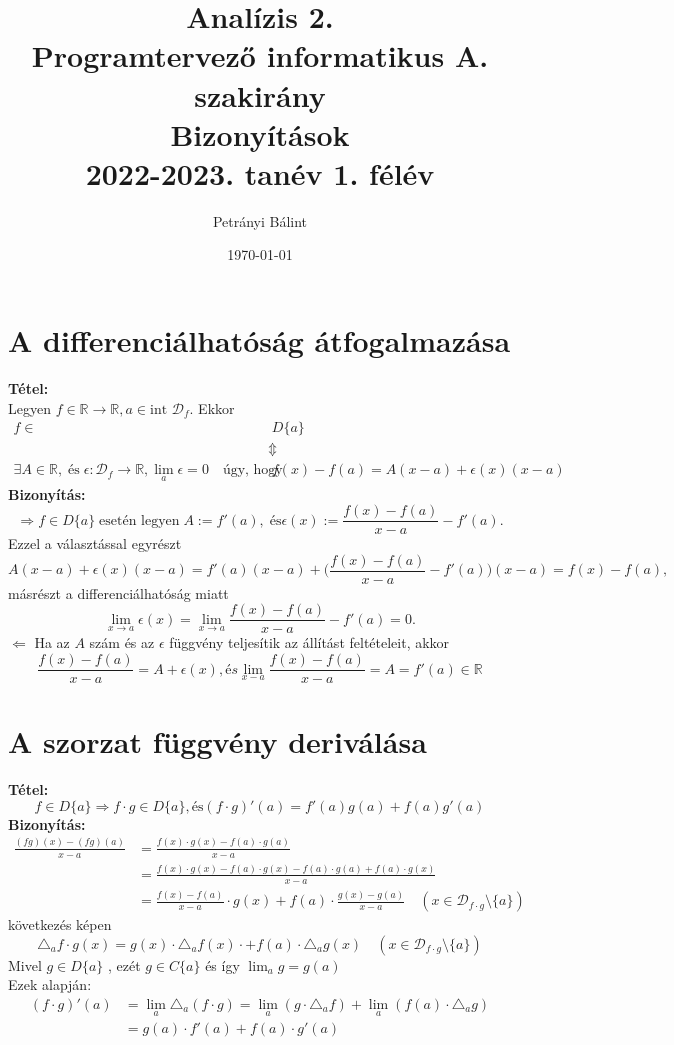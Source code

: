 \documentclass[10pt,a4paper]{article}
\date{\today}
\author{Petrányi Bálint}
\title{%
	\textbf{Analízis 2.} \\
	\textbf{Programtervező informatikus A. szakirány} \\
	\medskip
	Bizonyítások\\
	\large 2022-2023. tanév 1. félév
}
\newcommand{\D}{\mathcal{D}}
\newcommand{\f}[1][x]{f(#1)}
\newcommand{\g}[1][x]{g(#1)}
\begin{document}
\maketitle
\tableofcontents
\newpage
\section{A differenciálhatóság átfogalmazása}
\textbf{Tétel:} \\ 
Legyen $f \in \mathbb{R} \rightarrow \mathbb{R}, a \in \text{int } \mathcal{D}_f$. Ekkor
\[
\begin{split}
f \in & \; D\{a\} \\
& \Updownarrow \\
\exists A \in \mathbb{R}, \; \text{és} \; \epsilon : \mathcal{D}_f \rightarrow \mathbb{R}, \lim_a{\epsilon} = 0 \quad \text{úgy, hogy } & \; f(x)- f(a) = A(x-a)+\epsilon (x)(x-a)
\end{split}
\]
\textbf{Bizonyítás:}
\[
\Longrightarrow f \in D\{a\} \; \text{esetén legyen} \; A:=f'(a), \; \text{és} \epsilon (x) := \frac{f(x)-f(a)}{x-a} -f'(a).
\]
Ezzel a választással egyrészt
\[
A(x-a) + \epsilon (x)(x-a) =f'(a)(x-a)+\Big(\frac{f(x)-f(a)}{x-a}-f'(a)\Big)(x-a) =f(x)-f(a),
\]
másrészt a differenciálhatóság miatt
\[
\lim\limits_{x\rightarrow a} \epsilon (x) = \lim\limits_{x\rightarrow a} \frac{f(x)-f(a)}{x-a}-f'(a)=0.
\]
$\Longleftarrow$ Ha az $A$ szám és az $\epsilon$ függvény teljesítik az állítást feltételeit, akkor 
\[
\frac{f(x)-f(a)}{x-a} = A + \epsilon (x), és \lim\limits_{x-a} \frac{f(x)-f(a)}{x-a} = A = f'(a) \in \mathbb{R}
\]
\newpage
\section{A szorzat függvény deriválása}
\textbf{Tétel:}
\[
f\in D\{a\} \Longrightarrow    f\cdot g \in D\{a\},  \text{és}  (f\cdot g)'(a) =f'(a)g(a)+ f(a)g'(a)
\]
\textbf{Bizonyítás:}
\begin{align*}
\frac{(fg)(x)-(fg)(a)}{x-a} &= \frac{f(x)\cdot g(x)-f(a)\cdot g(a)}{x-a}\\
 &= \frac{\f\cdot\g-\f[a]\cdot\g-\f[a]\cdot\g[a]+\f[a]\cdot\g}{x-a} \\
 &= \frac{\f-\f[a]}{x-a}\cdot\g + \f[a] \cdot \frac{\g-\g[a]}{x-a} \quad (x\in\D_{f\cdot g} \setminus \{a\})
\end{align*}
következés képen 
\[
\triangle_a f \cdot\g = \g \cdot \triangle_a\f\cdot + \f[a] \cdot \triangle_a\g \quad (x\in\D_{f\cdot g} \setminus \{a\})
\]
Mivel $g\in D \{a\}$ , ezét $g\in C\{a\}$ és így $\lim_a g = \g[a]$
\\ Ezek alapján:
\begin{align*}
(f\cdot g)'(a) & = \lim\limits_a \triangle_a (f\cdot g) = \lim\limits_a (g\cdot \triangle_a f ) + \lim\limits_a (\f[a]\cdot\triangle_a g ) \\
& =\g[a]\cdot f'(a) + \f[a]\cdot g'(a)
\end{align*}
\newpage
\end{document}
